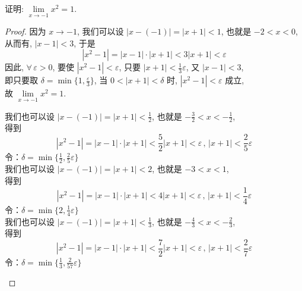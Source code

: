 \documentclass[color=green,titlestyle=hang]{elegantbook}%
\begin{document}
\begin{example}
证明: $\lim\limits_{x\to-1}x^2=1$.	
\end{example}\begin{proof}
因为 $x\to-1$, 我们可以设 $|x-(-1)|=|x+1|<1$, 也就是 $-2<x<0$,\\
从而有, $|x-1|<3$, 于是\[|x^2-1|=|x-1|\cdot|x+1|<3|x+1|<\varepsilon\]
因此, $\forall \,\varepsilon>0$, 要使 $|x^2-1|<\varepsilon$, 只要 $|x+1|<\tfrac{1}{3}\varepsilon$, 又 $|x-1|<3$,\\
即只要取 $\delta=\min\{1,\tfrac{\varepsilon}{3}\}$,
当 $0<|x+1|<\delta$ 时, $|x^2-1|<\varepsilon$ 成立, \\
故 $\lim\limits_{x\to-1}x^2=1$.
\begin{remark}
我们也可以设 $|x-(-1)|=|x+1|<\frac{1}{2}$, 也就是 $-\frac{3}{2}<x<-\frac{1}{2}$,\\
得到\[|x^2-1|=|x-1|\cdot|x+1|<\frac{5}{2}|x+1|<\varepsilon\,,\,|x+1|<\frac{2}{5}\varepsilon\]
令：$\delta=\min\{\tfrac{1}{2},\tfrac{2}{5}\varepsilon\}$\\
我们也可以设 $|x-(-1)|=|x+1|<2$, 也就是 $-3<x<1$,\\
得到\[|x^2-1|=|x-1|\cdot|x+1|<4|x+1|<\varepsilon\,,\,|x+1|<\frac{1}{4}\varepsilon\]
令：$\delta=\min\{2,\tfrac{1}{4}\varepsilon\}$\\
我们也可以设 $|x-(-1)|=|x+1|<\frac{1}{3}$, 也就是 $-\frac{4}{3}<x<-\frac{2}{3}$,\\
得到\[|x^2-1|=|x-1|\cdot|x+1|<\frac{7}{2}|x+1|<\varepsilon\,,\,|x+1|<\frac{2}{7}\varepsilon\]
令：$\delta=\min\{\tfrac{1}{3},\tfrac{2}{57}\varepsilon\}$
\end{remark}
\end{proof}
\end{document}
